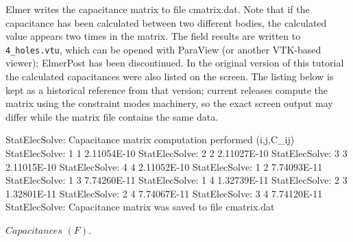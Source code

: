 \begin{flushleft}

Elmer writes the capacitance matrix to file cmatrix.dat.
Note that if the capacitance has been calculated between two different bodies, the calculated value appears two times in the matrix.
The field results are written to {\tt 4\_holes.vtu}, which can be opened with
ParaView (or another VTK-based viewer); ElmerPost has been discontinued.
In the original version of this tutorial the calculated capacitances were also
listed on the screen. The listing below is kept as a historical reference from
that version; current releases compute the matrix using the constraint modes
machinery, so the exact screen output may differ while the matrix file contains
the same data.

\begin{center}
\ttbegin
StatElecSolve: Capacitance matrix computation performed (i,j,C_ij)
StatElecSolve:   1  1    2.11054E-10
StatElecSolve:   2  2    2.11027E-10
StatElecSolve:   3  3    2.11015E-10
StatElecSolve:   4  4    2.11052E-10
StatElecSolve:   1  2    7.74093E-11
StatElecSolve:   1  3    7.74260E-11
StatElecSolve:   1  4    1.32739E-11
StatElecSolve:   2  3    1.32801E-11
StatElecSolve:   2  4    7.74067E-11
StatElecSolve:   3  4    7.74120E-11
StatElecSolve: Capacitance matrix was saved to file cmatrix.dat
\ttend 

$Capacitances$ $(F)$.
\end{center}


\end{flushleft}





























